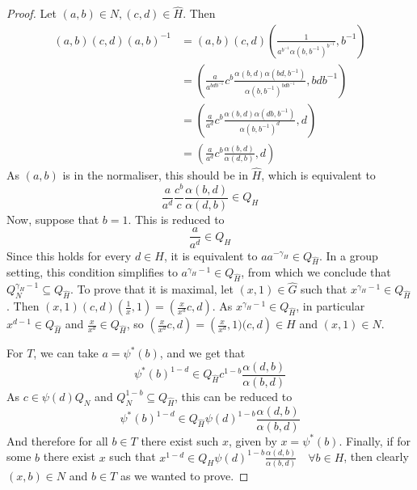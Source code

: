 \documentclass{article}
\begin{document}
\begin{proof}
    Let $(a,b)\in N, (c,d) \in \hat{H}$. Then
    \begin{align*}
        (a,b)(c,d)(a,b)^{-1} & = (a,b)(c,d) \left( \frac{1}{a^{b^{-1}}\alpha(b,b^{-1})^{b^{-1}}} ,b^{-1}\right) \\ & = \left( \frac{a}{a^{bdb^{-1}}} c^{b}\frac{\alpha(b,d)\alpha(bd,b^{-1})}{\alpha(b,b^{-1})^{bdb^{-1}}}, bdb^{-1}\right) \\ & = \left( \frac{a}{a^{d}} c^{b}\frac{\alpha(b,d)\alpha(db,b^{-1})}{\alpha(b,b^{-1})^{d}}, d\right) \\ & = \left( \frac{a}{a^{d}} c^{b}\frac{\alpha(b,d)}{\alpha(d,b)}, d\right) 
    \end{align*}
    As $(a,b)$ is in the normaliser, this should be in $\hat{H}$, which is equivalent to
    \begin{equation}
        \frac{a}{a^{d}} \frac{c^{b}}{c}\frac{\alpha(b,d)}{\alpha(d,b)} \in Q_{H}
    \end{equation}
    Now, suppose that $b=1$. This is reduced to
    \begin{equation}
        \frac{a}{a^{d}} \in Q_{H}
    \end{equation}
   Since this holds for every $d \in H$, it is equivalent to $a a^{-\gamma_H} \in Q_{\hat{H}}$. In a group setting, this condition simplifies to $a^{\gamma_H - 1} \in Q_{\hat{H}}$, from which we conclude that $Q_N^{\gamma_H - 1} \subseteq Q_{\hat{H}}$. To prove that it is maximal, let $(x,1) \in \hat{G}$ such that $x^{\gamma_H-1} \in Q_{\hat{H}}$. Then $(x,1)(c,d)(\frac{1}{x},1) =  \left(\frac{x}{x^d}c,d \right)$. As $x^{\gamma_H-1} \in Q_{\hat{H}}$, in particular $x^{d-1} \in Q_{\hat{H}}$ and $\frac{x}{x^d}\in Q_{\hat{H}}$, so $\left(\frac{x}{x^d}c,d \right) = \left(\frac{x}{x^d},1) (c,d \right)\in H$ and $(x,1) \in N$.

    For $T$, we can take $a=\psi^*(b)$, and we get that
    \begin{equation}
        \psi^{*}(b)^{1-d} \in Q_{\hat{H}} c^{1-b} \frac{\alpha(d,b)}{\alpha(b,d)}
    \end{equation}
    As $c\in \psi(d) Q_N$ and $Q_N^{1-b} \subseteq Q_{\hat{H}}$, this can be reduced to
    \begin{equation}
        \psi^{*}(b)^{1-d} \in Q_{\hat{H}} \psi(d)^{1-b} \frac{\alpha(d,b)}{\alpha(b,d)}
    \end{equation}
    And therefore for all $b\in T$ there exist such $x$, given by $x=\psi^*(b)$. Finally, if for some $b$ there exist $x$ such that $ x^{1-d}  \in Q_{H} \psi(d)^{1-b} \frac{\alpha(d,b)}{\alpha(b,d)}\quad \forall b \in H$, then clearly $(x,b) \in N$ and $b\in T$ as we wanted to prove.
\end{proof}
\end{document}
